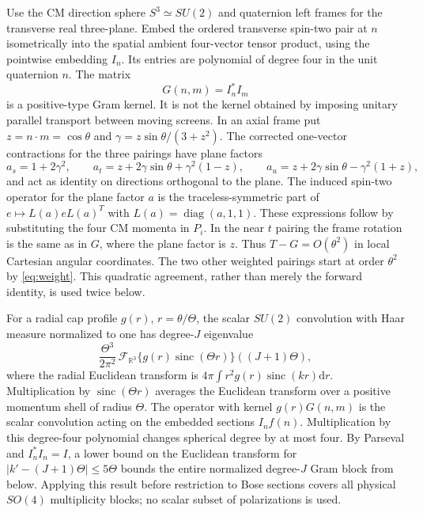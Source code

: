 \documentclass[11pt,a4paper]{article}
\theoremstyle{definition}
\theoremstyle{remark}
\newcommand{\dS}{\mathrm{d}}
\newcommand{\sinc}{\operatorname{sinc}}
\begin{document}
Use the CM direction sphere $S^3\simeq SU(2)$ and quaternion left frames for the transverse real three-plane. Embed the ordered transverse spin-two pair at $n$ isometrically into the spatial ambient four-vector tensor product, using the pointwise embedding $I_n$. Its entries are polynomial of degree four in the unit quaternion $n$. The matrix
\begin{equation}\label{eq:gram}
 G(n,m)=I_n^*I_m
\end{equation}
is a positive-type Gram kernel. It is not the kernel obtained by imposing unitary parallel transport between moving screens. In an axial frame put $z=n\cdot m=\cos\theta$ and $\gamma=z\sin\theta/(3+z^2)$. The corrected one-vector contractions for the three pairings have plane factors
\[
 a_s=1+2\gamma^2,\qquad
 a_t=z+2\gamma\sin\theta+\gamma^2(1-z),\qquad
 a_u=z+2\gamma\sin\theta-\gamma^2(1+z),
\]
and act as identity on directions orthogonal to the plane. The induced spin-two operator for the plane factor $a$ is the traceless-symmetric part of $e\mapsto L(a)eL(a)^T$ with $L(a)=\operatorname{diag}(a,1,1)$. These expressions follow by substituting the four CM momenta in $P_i$. In the near $t$ pairing the frame rotation is the same as in $G$, where the plane factor is $z$. Thus $T-G=O(\theta^2)$ in local Cartesian angular coordinates. The two other weighted pairings start at order $\theta^2$ by \eqref{eq:weight}. This quadratic agreement, rather than merely the forward identity, is used twice below.

For a radial cap profile $g(r)$, $r=\theta/\Theta$, the scalar $SU(2)$ convolution with Haar measure normalized to one has degree-$J$ eigenvalue
\begin{equation}\label{eq:central}
 \frac{\Theta^3}{2\pi^2}\,
 \mathcal F_{\mathbb R^3}\{g(r)\sinc(\Theta r)\}((J+1)\Theta),
\end{equation}
where the radial Euclidean transform is $4\pi\int r^2g(r)\sinc(kr)\dS r$. Multiplication by $\sinc(\Theta r)$ averages the Euclidean transform over a positive momentum shell of radius $\Theta$. The operator with kernel $g(r)G(n,m)$ is the scalar convolution acting on the embedded sections $I_n f(n)$. Multiplication by this degree-four polynomial changes spherical degree by at most four. By Parseval and $I_n^*I_n=I$, a lower bound on the Euclidean transform for $|k'-(J+1)\Theta|\le5\Theta$ bounds the entire normalized degree-$J$ Gram block from below. Applying this result before restriction to Bose sections covers all physical $SO(4)$ multiplicity blocks; no scalar subset of polarizations is used.
\end{document}
